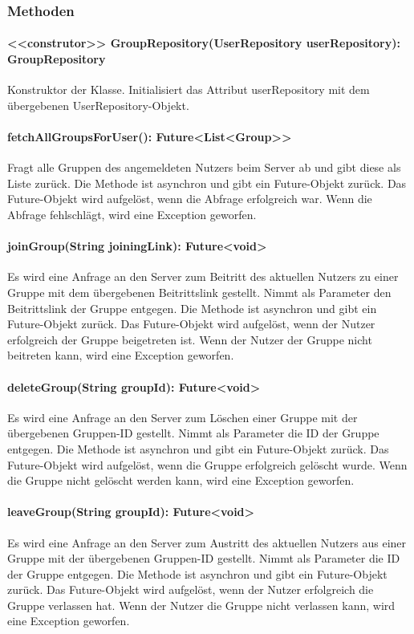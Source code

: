 \documentclass[parskip=full]{scrartcl}
\begin{document}
\subsubsection{Methoden}
\paragraph{<<construtor>> GroupRepository(UserRepository userRepository): GroupRepository}
Konstruktor der Klasse. Initialisiert das Attribut userRepository mit dem übergebenen UserRepository-Objekt.
\paragraph{fetchAllGroupsForUser(): Future<List<Group>>}
Fragt alle Gruppen des angemeldeten Nutzers beim Server ab und gibt diese als Liste zurück. Die Methode ist asynchron und gibt ein Future-Objekt zurück. Das Future-Objekt wird aufgelöst, wenn die Abfrage erfolgreich war. Wenn die Abfrage fehlschlägt, wird eine Exception geworfen.
\paragraph{joinGroup(String joiningLink): Future<void>}
Es wird eine Anfrage an den Server zum Beitritt des aktuellen Nutzers zu einer Gruppe mit dem übergebenen Beitrittslink gestellt. Nimmt als Parameter den Beitrittslink der Gruppe entgegen. Die Methode ist asynchron und gibt ein Future-Objekt zurück. Das Future-Objekt wird aufgelöst, wenn der Nutzer erfolgreich der Gruppe beigetreten ist. Wenn der Nutzer der Gruppe nicht beitreten kann, wird eine Exception geworfen.
\paragraph{deleteGroup(String groupId): Future<void>}
Es wird eine Anfrage an den Server zum Löschen einer Gruppe mit der übergebenen Gruppen-ID gestellt. Nimmt als Parameter die ID der Gruppe entgegen. Die Methode ist asynchron und gibt ein Future-Objekt zurück. Das Future-Objekt wird aufgelöst, wenn die Gruppe erfolgreich gelöscht wurde. Wenn die Gruppe nicht gelöscht werden kann, wird eine Exception geworfen.
\paragraph{leaveGroup(String groupId): Future<void>}
Es wird eine Anfrage an den Server zum Austritt des aktuellen Nutzers aus einer Gruppe mit der übergebenen Gruppen-ID gestellt. Nimmt als Parameter die ID der Gruppe entgegen. Die Methode ist asynchron und gibt ein Future-Objekt zurück. Das Future-Objekt wird aufgelöst, wenn der Nutzer erfolgreich die Gruppe verlassen hat. Wenn der Nutzer die Gruppe nicht verlassen kann, wird eine Exception geworfen.
\end{document}
